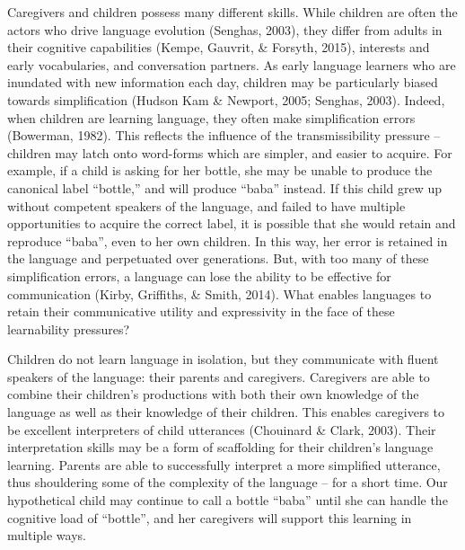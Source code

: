 \documentclass[10pt, letterpaper]{article}
\begin{document}
Caregivers and children possess many different skills. While children
are often the actors who drive language evolution (Senghas, 2003), they
differ from adults in their cognitive capabilities (Kempe, Gauvrit, \&
Forsyth, 2015), interests and early vocabularies, and conversation
partners. As early language learners who are inundated with new
information each day, children may be particularly biased towards
simplification (Hudson Kam \& Newport, 2005; Senghas, 2003). Indeed,
when children are learning language, they often make simplification
errors (Bowerman, 1982). This reflects the influence of the
transmissibility pressure -- children may latch onto word-forms which
are simpler, and easier to acquire. For example, if a child is asking
for her bottle, she may be unable to produce the canonical label
``bottle,'' and will produce ``baba'' instead. If this child grew up
without competent speakers of the language, and failed to have multiple
opportunities to acquire the correct label, it is possible that she
would retain and reproduce ``baba'', even to her own children. In this
way, her error is retained in the language and perpetuated over
generations. But, with too many of these simplification errors, a
language can lose the ability to be effective for communication (Kirby,
Griffiths, \& Smith, 2014). What enables languages to retain their
communicative utility and expressivity in the face of these learnability
pressures?

Children do not learn language in isolation, but they communicate with
fluent speakers of the language: their parents and caregivers.
Caregivers are able to combine their children's productions with both
their own knowledge of the language as well as their knowledge of their
children. This enables caregivers to be excellent interpreters of child
utterances (Chouinard \& Clark, 2003). Their interpretation skills may
be a form of scaffolding for their children's language learning. Parents
are able to successfully interpret a more simplified utterance, thus
shouldering some of the complexity of the language -- for a short time.
Our hypothetical child may continue to call a bottle ``baba'' until she
can handle the cognitive load of ``bottle'', and her caregivers will
support this learning in multiple ways.
\end{document}

